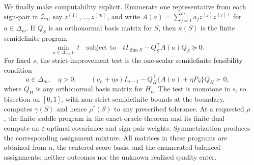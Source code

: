 We finally make computability explicit.  Enumerate one representative from each sign-pair in \(\mathcal Z_n\), say \(z^{(1)},\ldots,z^{(m)}\), and write
\(A(a)=\sum_{j=1}^m a_jz^{(j)}z^{(j)\top}\) for \(a\in\Delta_m\).  If \(Q_S\) is an orthonormal basis matrix for \(S\), then \(\kappa(S)\) is the finite semidefinite program
\[
\min_{a\in\Delta_m,\,t}\ t
\quad\text{subject to}\quad
tI_{\dim S}-Q_S^\top A(a)Q_S\succeq0.
\]
For fixed \(s\), the strict-improvement test is the one-scalar semidefinite feasibility condition
\[
a\in\Delta_m,\quad \eta>0,
\qquad (c_n+\eta s)I_{n-1}-Q_H^\top\{A(a)+\eta P_S\}Q_H\succ0,
\]
where \(Q_H\) is any orthonormal basis matrix for \(H_n\).  The test is monotone in \(s\), so bisection on \([0,1]\), with non-strict semidefinite bounds at the boundary, computes \(\gamma(S)\) and hence \(\rho^*(S)\) to any prescribed tolerance.  At a requested \(\rho\), the finite saddle program in the exact-oracle theorem and its finite dual compute an \(\varepsilon\)-optimal covariance and sign-pair weights.  Symmetrization produces the corresponding assignment mixture.  All matrices in these programs are obtained from \(n\), the centered score basis, and the enumerated balanced assignments; neither outcomes nor the unknown realized quality enter.